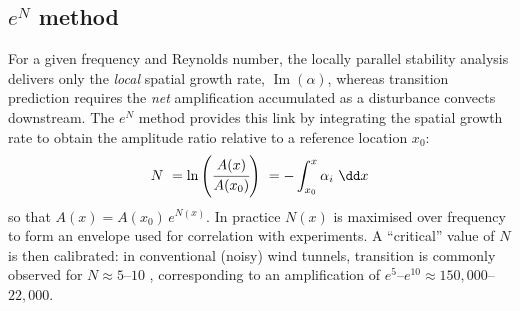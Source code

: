 
\subsection{$e^N$ method}





For a given frequency and Reynolds number, the locally parallel stability analysis delivers only the \emph{local} spatial growth rate, $\operatorname{Im}(\alpha)$, whereas transition prediction requires the \emph{net} amplification accumulated as a disturbance convects downstream. The $e^N$ method \citep{SmithGamberoni1956,vanIngen1956} provides this link by integrating the spatial growth rate to obtain the amplitude ratio relative to a reference location $x_0$:
\begin{equation}
    N \ = \ln{ \left( \cfrac{A(x)}{A(x_0)} \right )} \ = - \int_{x_0}^{x} \alpha_i \ \dd x
\end{equation}
so that $A(x)=A(x_0)\,e^{N(x)}$. In practice $N(x)$ is maximised over frequency to form an envelope used for correlation with experiments. A “critical” value of $N$ is then calibrated: in conventional (noisy) wind tunnels, transition is commonly observed for $N \approx 5$–$10$ \citep{Schneider2015}, corresponding to an amplification of $e^{5}$–$e^{10}\!\approx\!150{,}000$–$22{,}000$. 

